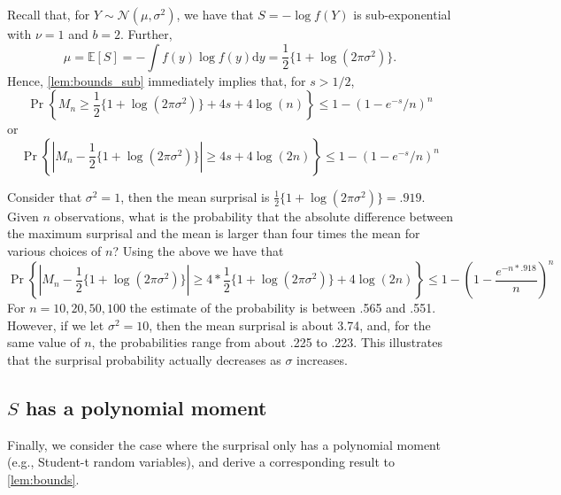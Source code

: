 \documentclass[a4paper,11pt]{article}
\newcommand{\dt}{\mathrm{d}}
\newcommand{\E}{\mathbb{E}}
\begin{document}
Recall that, for $Y\sim \mathcal{N}(\mu,\sigma^2)$, we have that $S=-\log f(Y)$ is sub-exponential with $\nu=1$ and $b=2$. Further,
$$
	\mu=\E[S]=-\int f(y)\log f(y)\dt y=\frac{1}{2}\{1+\log (2\pi\sigma^2)\}.
$$
Hence, \cref{lem:bounds_sub} immediately implies that, for $s>1/2$,
$$
	\Pr\left\{ M_n\ge \frac{1}{2}\{1+\log (2\pi\sigma^2)\}+4s+4\log(n)\right\} \le 1-
	(1-e^{-s}/n)^n
$$
or
$$
	\Pr\left\{ \left|M_n-\frac{1}{2}\{1+\log (2\pi\sigma^2)\}\right|\ge 4s+4\log(2n)\right\}\le 1-
	(1-e^{-s}/n)^n
$$

Consider that $\sigma^2=1$, then the mean surprisal is $\frac{1}{2}\{1+\log (2\pi\sigma^2)\}=.919$. Given $n$ observations, what is the probability that the absolute difference between the maximum surprisal and the mean is larger than four times the mean for various choices of $n$?
Using the above we have that
$$
	\Pr\left\{ |M_n-\frac{1}{2}\{1+\log (2\pi\sigma^2)\}|\ge 4*\frac{1}{2}\{1+\log (2\pi\sigma^2)\}+4\log(2n)\right\}\le 1-\left(1-\frac{e^{-n*.918}}{n}\right)^n
$$
For $n=10,20,50,100$ the estimate of the probability is between .565 and .551. However, if we let $\sigma^2=10$, then the mean surprisal is about 3.74, and, for the same value of $n$, the probabilities range from about .225 to .223. This illustrates that the surprisal probability actually decreases as $\sigma$ increases.

\subsection{$S$ has a polynomial moment}

Finally, we consider the case where the surprisal only has a polynomial moment (e.g., Student-t random variables), and derive a corresponding result to \cref{lem:bounds}.
\end{document}
